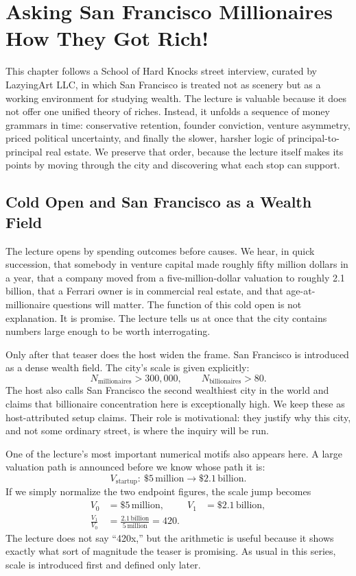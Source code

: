 \chapter{Asking San Francisco Millionaires How They Got Rich!}

This chapter follows a School of Hard Knocks street interview, curated by LazyingArt LLC, in which San Francisco is treated not as scenery but as a working environment for studying wealth. The lecture is valuable because it does not offer one unified theory of riches. Instead, it unfolds a sequence of money grammars in time: conservative retention, founder conviction, venture asymmetry, priced political uncertainty, and finally the slower, harsher logic of principal-to-principal real estate. We preserve that order, because the lecture itself makes its points by moving through the city and discovering what each stop can support.

\section{Cold Open and San Francisco as a Wealth Field}

The lecture opens by spending outcomes before causes. We hear, in quick succession, that somebody in venture capital made roughly fifty million dollars in a year, that a company moved from a five-million-dollar valuation to roughly 2.1 billion, that a Ferrari owner is in commercial real estate, and that age-at-millionaire questions will matter. The function of this cold open is not explanation. It is promise. The lecture tells us at once that the city contains numbers large enough to be worth interrogating.

Only after that teaser does the host widen the frame. San Francisco is introduced as a dense wealth field. The city's scale is given explicitly:
\begin{equation}
N_{\text{millionaires}} > 300{,}000,\qquad
N_{\text{billionaires}} > 80.
\end{equation}
The host also calls San Francisco the second wealthiest city in the world and claims that billionaire concentration here is exceptionally high. We keep these as host-attributed setup claims. Their role is motivational: they justify why this city, and not some ordinary street, is where the inquiry will be run.

One of the lecture's most important numerical motifs also appears here. A large valuation path is announced before we know whose path it is:
\begin{equation}
V_{\text{startup}}:\ \$5\,\text{million}\to \$2.1\,\text{billion}.
\end{equation}
If we simply normalize the two endpoint figures, the scale jump becomes
\begin{align}
V_0 &= \$5\,\text{million}, &
V_1 &= \$2.1\,\text{billion},\\
\frac{V_1}{V_0} &= \frac{2.1\,\text{billion}}{5\,\text{million}} = 420.
\end{align}
The lecture does not say ``420x,'' but the arithmetic is useful because it shows exactly what sort of magnitude the teaser is promising. As usual in this series, scale is introduced first and defined only later.

